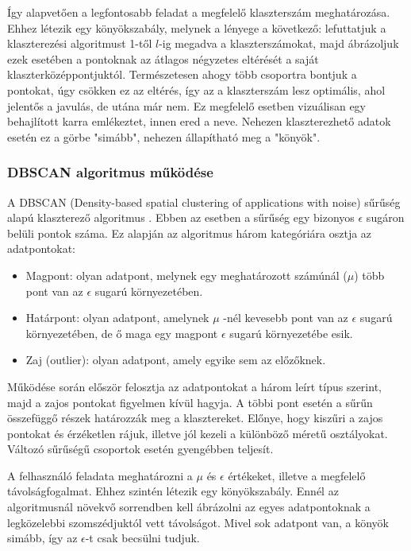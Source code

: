 \documentclass[12pt]{article}
\begin{document}
Így alapvetően a legfontosabb feladat a megfelelő klaszterszám meghatározása. Ehhez létezik egy könyökszabály, melynek a lényege a következő: lefuttatjuk a klaszterezési algoritmust 1-től $l$-ig megadva a klaszterszámokat, majd ábrázoljuk ezek esetében a pontoknak az átlagos négyzetes eltérését a saját klaszterközéppontjuktól. Természetesen ahogy több csoportra bontjuk a pontokat, úgy csökken ez az eltérés, így az a klaszterszám lesz optimális, ahol jelentős a javulás, de utána már nem. Ez megfelelő esetben vizuálisan egy behajlított karra emlékeztet, innen ered a neve. Nehezen klaszterezhető adatok esetén ez a görbe "simább", nehezen állapítható meg a "könyök".

\subsubsection{DBSCAN algoritmus működése}

A DBSCAN (Density-based spatial clustering of applications with noise) sűrűség alapú klaszterező algoritmus
. Ebben az esetben a sűrűség egy bizonyos $\epsilon$ sugáron belüli pontok száma. Ez alapján az algoritmus három kategóriára osztja az adatpontokat:
\begin{itemize}
\item Magpont: olyan adatpont, melynek egy meghatározott számúnál ($\mu$) több pont van az $\epsilon$ sugarú környezetében.
\item Határpont: olyan adatpont, amelynek $\mu$ -nél kevesebb pont van az $\epsilon$ sugarú környezetében, de ő maga egy magpont $\epsilon$ sugarú környezetébe esik.
\item Zaj (outlier): olyan adatpont, amely egyike sem az előzőknek.
\end{itemize}

Működése során először felosztja az adatpontokat a három leírt típus szerint, majd a zajos pontokat figyelmen kívül hagyja. A többi pont esetén a sűrűn összefüggő részek határozzák meg a klasztereket. Előnye, hogy kiszűri a zajos pontokat és érzéketlen rájuk, illetve jól kezeli a különböző méretű osztályokat. Változó sűrűségű csoportok esetén gyengébben teljesít.

A felhasználó feladata meghatározni a $\mu$ és $\epsilon$ értékeket, illetve a megfelelő távolságfogalmat. Ehhez szintén létezik egy könyökszabály. Ennél az algoritmusnál növekvő sorrendben kell ábrázolni az egyes adatpontoknak a legközelebbi szomszédjuktól vett távolságot. Mivel sok adatpont van, a könyök simább, így az $\epsilon$-t csak becsülni tudjuk. 
\end{document}
